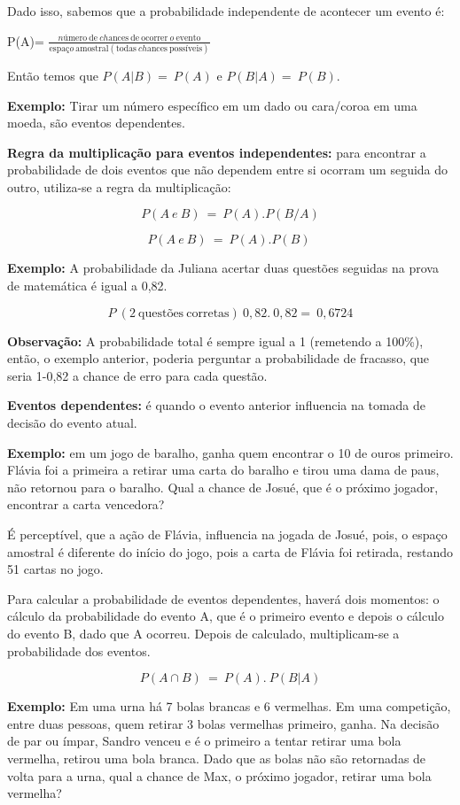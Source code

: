 {Dado isso, sabemos que a probabilidade independente de acontecer um
evento é:

P(A)=
\(\frac{nú\text{mero}\ \text{de}\ ch\text{ances}\ \text{de}\ \text{ocorrer}\ o\ \text{evento}}{\text{espa}ço\ \text{amostral}(\text{todas}\ ch\text{ances}\ \text{poss}í\text{veis})}\)

Então temos que \(P(A|B) = \ P(A)\) e \(P(B|A) = \ P(B)\).

\textbf{Exemplo:} Tirar um número específico em um dado ou cara/coroa em
uma moeda, são eventos dependentes.

\textbf{Regra da multiplicação para eventos independentes:} para
encontrar a probabilidade de dois eventos que não dependem entre si
ocorram um seguida do outro, utiliza-se a regra da multiplicação:

\[P(A\ e\ B)\  = \ P(A).P(B/A)\]

\[P(A\ e\ B)\  = \ P(A).P(B)\ \]

\textbf{Exemplo:} A probabilidade da Juliana acertar duas questões
seguidas na prova de matemática é igual a 0,82.

\[P\ (2\ \text{quest}õ\text{es}\ \text{corretas})\ 0,82.\ 0,82 = \ 0,6724\]

\textbf{Observação:} A probabilidade total é sempre igual a 1 (remetendo
a 100\%), então, o exemplo anterior, poderia perguntar a probabilidade
de fracasso, que seria 1-0,82 a chance de erro para cada questão.

\textbf{Eventos dependentes:} é quando o evento anterior influencia na
tomada de decisão do evento atual.

\textbf{Exemplo:} em um jogo de baralho, ganha quem encontrar o 10 de
ouros primeiro. Flávia foi a primeira a retirar uma carta do baralho e
tirou uma dama de paus, não retornou para o baralho. Qual a chance de
Josué, que é o próximo jogador, encontrar a carta vencedora?

É perceptível, que a ação de Flávia, influencia na jogada de Josué,
pois, o espaço amostral é diferente do início do jogo, pois a carta de
Flávia foi retirada, restando 51 cartas no jogo.

Para calcular a probabilidade de eventos dependentes, haverá dois
momentos: o cálculo da probabilidade do evento A, que é o primeiro
evento e depois o cálculo do evento B, dado que A ocorreu. Depois de
calculado, multiplicam-se a probabilidade dos eventos.

\[P(A \cap B)\  = \ P(A).\ P(B|A)\]

\textbf{Exemplo:} Em uma urna há 7 bolas brancas e 6 vermelhas. Em uma
competição, entre duas pessoas, quem retirar 3 bolas vermelhas primeiro,
ganha. Na decisão de par ou ímpar, Sandro venceu e é o primeiro a tentar
retirar uma bola vermelha, retirou uma bola branca. Dado que as bolas
não são retornadas de volta para a urna, qual a chance de Max, o próximo
jogador, retirar uma bola vermelha?

}

